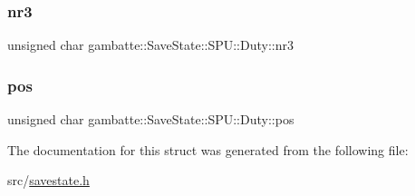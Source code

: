 \subsubsection{\texorpdfstring{nr3}{nr3}}
{\footnotesize\ttfamily unsigned char gambatte\+::\+Save\+State\+::\+S\+P\+U\+::\+Duty\+::nr3}

\mbox{\label{structgambatte_1_1SaveState_1_1SPU_1_1Duty_ad58b798555389e0cb08e75307b6c8fce}} 
\subsubsection{\texorpdfstring{pos}{pos}}
{\footnotesize\ttfamily unsigned char gambatte\+::\+Save\+State\+::\+S\+P\+U\+::\+Duty\+::pos}



The documentation for this struct was generated from the following file\+:\begin{DoxyCompactItemize}
\item 
src/\hyperlink{savestate_8h}{savestate.\+h}\end{DoxyCompactItemize}
